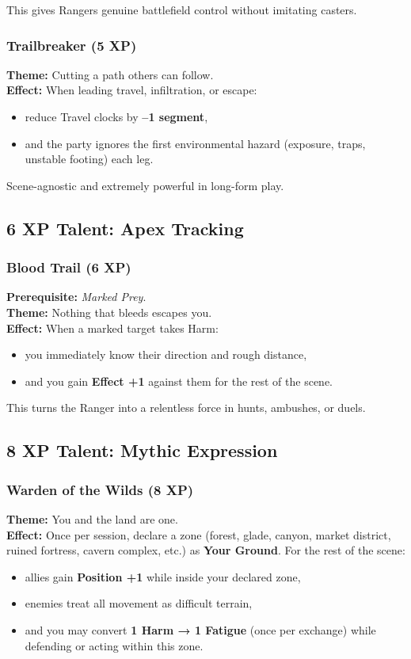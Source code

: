\documentclass[11pt]{book}
\begin{document}
This gives Rangers genuine battlefield control without imitating casters.

\subsubsection{Trailbreaker (5 XP)}
\textbf{Theme:} Cutting a path others can follow.\\
\textbf{Effect:} When leading travel, infiltration, or escape:
\begin{itemize}
  \item reduce Travel clocks by \textbf{--1 segment},
  \item and the party ignores the first environmental hazard
        (exposure, traps, unstable footing) each leg.
\end{itemize}

Scene-agnostic and extremely powerful in long-form play.

\subsection{6 XP Talent: Apex Tracking}

\subsubsection{Blood Trail (6 XP)}
\textbf{Prerequisite:} \emph{Marked Prey}.\\
\textbf{Theme:} Nothing that bleeds escapes you.\\
\textbf{Effect:} When a marked target takes Harm:
\begin{itemize}
  \item you immediately know their direction and rough distance,
  \item and you gain \textbf{Effect +1} against them for the rest of the scene.
\end{itemize}

This turns the Ranger into a relentless force in hunts, ambushes, or duels.

\subsection{8 XP Talent: Mythic Expression}

\subsubsection{Warden of the Wilds (8 XP)}
\textbf{Theme:} You and the land are one.\\
\textbf{Effect:} Once per session, declare a zone (forest, glade, canyon,
market district, ruined fortress, cavern complex, etc.) as \textbf{Your Ground}.
For the rest of the scene:
\begin{itemize}
  \item allies gain \textbf{Position +1} while inside your declared zone,
  \item enemies treat all movement as difficult terrain,
  \item and you may convert \textbf{1 Harm → 1 Fatigue} (once per exchange)
        while defending or acting within this zone.
\end{itemize}
\end{document}
